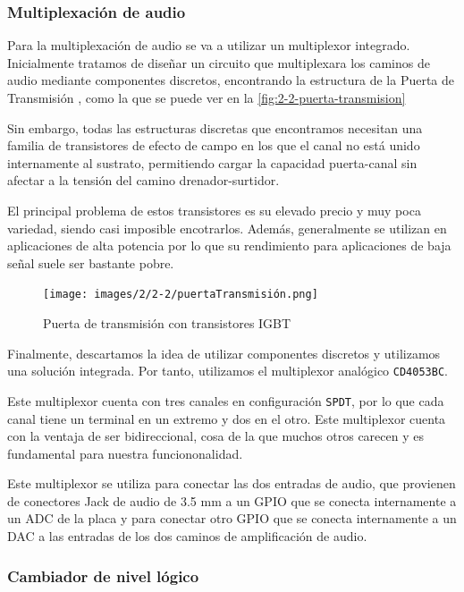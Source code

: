 \subsubsection{Multiplexación de audio}

Para la multiplexación de audio se va a utilizar un multiplexor integrado. Inicialmente tratamos de diseñar un circuito que multiplexara los caminos de audio mediante componentes discretos, encontrando la estructura de la Puerta de Transmisión \cite{TransmissionGate}, como la que se puede ver en la \autoref{fig:2-2-puerta-transmision}

Sin embargo, todas las estructuras discretas que encontramos necesitan una familia de transistores de efecto de campo en los que el canal no está unido internamente al sustrato, permitiendo cargar la capacidad puerta-canal sin afectar a la tensión del camino drenador-surtidor. 

El principal problema de estos transistores es su elevado precio y muy poca variedad, siendo casi imposible encotrarlos. Además, generalmente se utilizan en aplicaciones de alta potencia por lo que su rendimiento para aplicaciones de baja señal suele ser bastante pobre.

\begin{figure}[h]
    \centering
    \texttt{[image: images/2/2-2/puertaTransmisión.png]}
    \caption{Puerta de transmisión con transistores IGBT}
    \label{fig:2-2-puerta-transmision}
\end{figure}

Finalmente, descartamos la idea de utilizar componentes discretos y utilizamos una solución integrada. Por tanto, utilizamos el multiplexor analógico \texttt{CD4053BC}. \cite{CD4053BDataSheet}

Este multiplexor cuenta con tres canales en configuración \texttt{SPDT}, por lo que cada canal tiene un terminal en un extremo y dos en el otro. Este multiplexor cuenta con la ventaja de ser bidireccional, cosa de la que muchos otros carecen y es fundamental para nuestra funciononalidad.

Este multiplexor se utiliza para conectar las dos entradas de audio, que provienen de conectores Jack de audio de 3.5 mm a un GPIO que se conecta internamente a un ADC de la placa y para conectar otro GPIO que se conecta internamente a un DAC a las entradas de los dos caminos de amplificación de audio. 

\subsubsection{Cambiador de nivel lógico}


